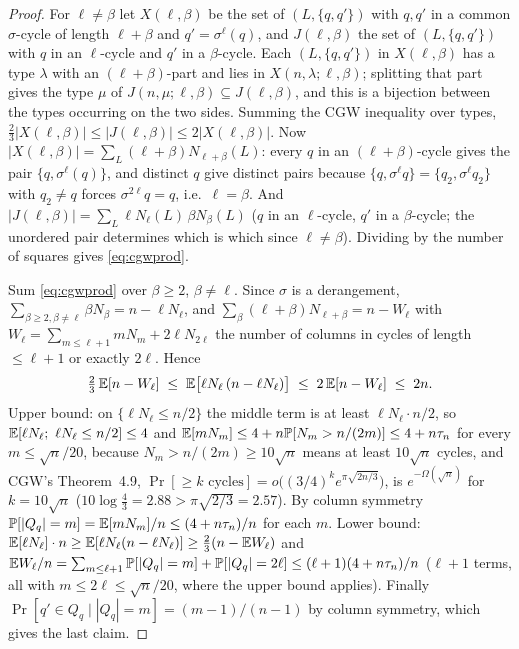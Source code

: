\begin{proof}
For $\ell\ne\beta$ let $X(\ell,\beta)$ be the set of $(L,\{q,q'\})$
with $q,q'$ in a common $\sigma$-cycle of length $\ell+\beta$ and
$q'=\sigma^\ell(q)$, and $J(\ell,\beta)$ the set of $(L,\{q,q'\})$ with
$q$ in an $\ell$-cycle and $q'$ in a $\beta$-cycle.  Each $(L,\{q,q'\})$
in $X(\ell,\beta)$ has a type $\lambda$ with an $(\ell+\beta)$-part and
lies in $X(n,\lambda;\ell,\beta)$; splitting that part gives the type
$\mu$ of $J(n,\mu;\ell,\beta)\subseteq J(\ell,\beta)$, and this is a
bijection between the types occurring on the two sides.  Summing the
CGW inequality over types,
$\tfrac23|X(\ell,\beta)|\le|J(\ell,\beta)|\le2|X(\ell,\beta)|$.  Now
$|X(\ell,\beta)|=\sum_L(\ell+\beta)N_{\ell+\beta}(L)$: every $q$ in an
$(\ell+\beta)$-cycle gives the pair $\{q,\sigma^\ell(q)\}$, and
distinct $q$ give distinct pairs because $\{q,\sigma^\ell q\}=\{q_2,\sigma^\ell q_2\}$
with $q_2\ne q$ forces $\sigma^{2\ell}q=q$, i.e.\ $\ell=\beta$.  And
$|J(\ell,\beta)|=\sum_L\ell N_\ell(L)\,\beta N_\beta(L)$ ($q$ in an
$\ell$-cycle, $q'$ in a $\beta$-cycle; the unordered pair determines
which is which since $\ell\ne\beta$).  Dividing by the number of
squares gives \eqref{eq:cgwprod}.

Sum \eqref{eq:cgwprod} over $\beta\ge2$, $\beta\ne\ell$.  Since
$\sigma$ is a derangement, $\sum_{\beta\ge2,\beta\ne\ell}\beta N_\beta=n-\ell N_\ell$,
and $\sum_{\beta}(\ell+\beta)N_{\ell+\beta}=n-W_\ell$ with
$W_\ell=\sum_{m\le\ell+1}mN_m+2\ell N_{2\ell}$ the number of columns in
cycles of length $\le\ell+1$ or exactly $2\ell$.  Hence
\begin{equation}\label{eq:cgwsum}
\tfrac23\,\mathbb{E}[n-W_\ell]\;\le\;\mathbb{E}\bigl[\ell N_\ell\,(n-\ell N_\ell)\bigr]\;\le\;2\,\mathbb{E}[n-W_\ell]\;\le\;2n .
\end{equation}
Upper bound: on $\{\ell N_\ell\le n/2\}$ the middle term is at least
$\ell N_\ell\cdot n/2$, so $\mathbb{E}[\ell N_\ell;\ \ell N_\ell\le n/2]\le4$ and
$\mathbb{E}[mN_m]\le4+n\mathbb{P}[N_m>n/(2m)]\le4+n\tau_n$ for every $m\le\sqrt n/20$,
because $N_m>n/(2m)\ge10\sqrt n$ means at least $10\sqrt n$ cycles, and
CGW's Theorem~4.9, $\Pr[\ge k\text{ cycles}]=o\bigl((3/4)^ke^{\pi\sqrt{2n/3}}\bigr)$,
is $e^{-\Omega(\sqrt n)}$ for $k=10\sqrt n$ ($10\log\tfrac43=2.88>\pi\sqrt{2/3}=2.57$).
By column symmetry
$\mathbb{P}[|Q_q|=m]=\mathbb{E}[mN_m]/n\le(4+n\tau_n)/n$ for each $m$.  Lower bound:
$\mathbb{E}[\ell N_\ell]\cdot n\ge\mathbb{E}[\ell N_\ell(n-\ell N_\ell)]\ge\tfrac23(n-\mathbb{E} W_\ell)$
and $\mathbb{E} W_\ell/n=\sum_{m\le\ell+1}\mathbb{P}[|Q_q|=m]+\mathbb{P}[|Q_q|=2\ell]\le(\ell+1)(4+n\tau_n)/n$
($\ell+1$ terms, all with $m\le2\ell\le\sqrt n/20$, where the upper bound applies).
Finally $\Pr[q'\in Q_q\mid|Q_q|=m]=(m-1)/(n-1)$ by column symmetry,
which gives the last claim.
\end{proof}

